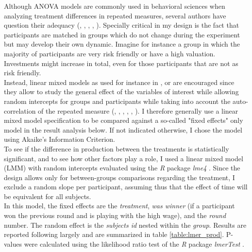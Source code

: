 Although ANOVA models are commonly used in behavioral sciences when analyzing treatment differences in repeated measures, several authors have question their adequacy (\cite{camilli1987}, \cite{vasey1987}, \cite{jaeger2008}, \cite{locker2007}, \cite{krueger2004}). Specially critical in my design is the fact that participants are matched in groups which do not change during the experiment but may develop their own dynamic. Imagine for instance a group in which the majority of participants are very risk friendly or have a high valuation. Investments might increase in total, even for those participants that are not as risk friendly.\\ 
    
Instead, linear mixed models as used for instance in \cite{szaszi2018}, \cite{holsen2009} or \cite{yue2010} are encouraged since they allow to study the general effect of the variables of interest while allowing random intercepts for groups and participants while taking into account the auto-correlation of the repeated measure (\cite{galecki2013}, \cite{bolker2009}, \cite{mcculloch2015}, \cite{barr2013}, \cite{baayen2008}, \cite{fitzmaurice2015}). I therefore generally use a linear mixed model specification to be compared against a so-called "fixed effects" only model in the result analysis below. If not indicated otherwise, I chose the model using Akaike's Information Criterion.\\
    
To see if the difference in production between the treatments is statistically significant, and to see how other factors play a role, I used a linear mixed model (LMM) with random intercepts evaluated using the \textit{R} package \textit{lme4} \citep{bates2015}. Since the design allows only for between-groups comparisons regarding the treatment, I exclude a random slope per participant, assuming thus that the effect of time will be equivalent for all subjects.\\

In this model, the fixed effects are the \textit{treatment}, \textit{was winner} (if a participant won the previous round and is playing with the high wage), and the \textit{round} number. The random effect is the \textit{subjects id} nested within the \textit{group}. Results are reported following largely \cite{barr2013} and are summarized in table \ref{table:lmer_prod}. P-values were calculated using the likelihood ratio test of the \textit{R} package \textit{lmerTest} \citep{kuznetsova2017}.\\

